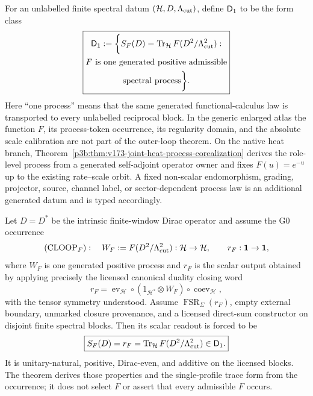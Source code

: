 \documentclass[12pt,a4paper]{article}
\begin{document}
\begin{definition}
\label{p3:def:D1}
For an unlabelled finite spectral datum \((\mathcal H,D,\Lambda_{\mathrm{cut}})\), define
\(\mathsf{D}_1\) to be the form class
\[
 \boxed{\begin{gathered}
 \mathsf{D}_1:=\biggl\{S_F(D)=\operatorname{Tr}_{\mathcal H}
 F(D^2/\Lambda_{\mathrm{cut}}^2):\\
 F\text{ is one generated positive admissible}\\
 \text{spectral process}\biggr\}.
 \end{gathered}}
\]
Here ``one process'' means that the same generated functional-calculus law is
transported to every unlabelled reciprocal block.  In the generic enlarged
atlas the function \(F\), its process-token occurrence, its regularity domain,
and the absolute scale calibration are not part of the outer-loop theorem.
On the native heat branch, Theorem~\ref{p3b:thm:v173-joint-heat-process-corealization}
derives the role-level process from a generated self-adjoint operator owner and
fixes \(F(u)=e^{-u}\) up to the existing rate--scale orbit.  A fixed non-scalar endomorphism, grading,
projector, source, channel label, or sector-dependent process law is an
additional generated datum and is typed accordingly.
\end{definition}

\begin{theorem}
\label{p3:thm:gp2-dcl-derivation}
Let \(D=D^*\) be the intrinsic finite-window Dirac operator and assume the G0
occurrence
\[
 (\mathrm{CLOOP}_{F}):\quad
 W_F:=F(D^2/\Lambda_{\mathrm{cut}}^2):\mathcal H\to\mathcal H,
 \qquad
 r_F:\mathbf1\to\mathbf1,
\]
where \(W_F\) is one generated positive process and \(r_F\) is the scalar
output obtained by applying precisely the licensed canonical duality
closing word
\[
 r_F=\operatorname{ev}_{\mathcal H}\circ
 (1_{\mathcal H^*}\otimes W_F)\circ\operatorname{coev}_{\mathcal H},
\]
with the tensor symmetry understood. Assume \(\operatorname{FSR}_{\Sigma}(r_F)\), empty external
boundary, unmarked closure provenance, and a licensed direct-sum constructor
on disjoint finite spectral blocks.
Then its scalar readout is forced to be
\[
 \boxed{S_F(D)=r_F
 =\operatorname{Tr}_{\mathcal H}F(D^2/\Lambda_{\mathrm{cut}}^2)\in\mathsf{D}_1.}
\]
It is unitary-natural, positive, Dirac-even, and additive on the licensed
blocks.  The theorem derives those properties and the single-profile trace
form from the occurrence; it does not select \(F\) or assert that every
admissible \(F\) occurs.
\end{theorem}
\end{document}
